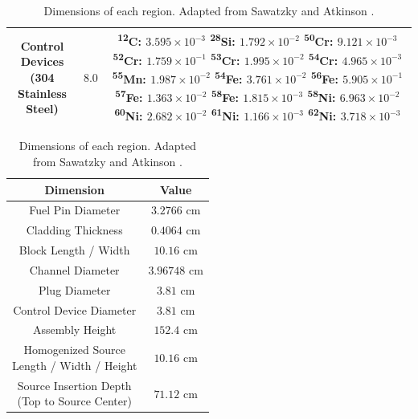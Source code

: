 \begin{table}[H]
{\begin{tabular}{|c|c|c|}
            \hline
            \makecell{Control Devices\\(304 Stainless Steel)} & $8.0$ & \makecell{\textsuperscript{12}C: $3.595\times 10^{-3}$\\\textsuperscript{28}Si: $1.792\times 10^{-2}$\\\textsuperscript{50}Cr: $9.121\times 10^{-3}$\\\textsuperscript{52}Cr: $1.759\times 10^{-1}$\\\textsuperscript{53}Cr: $1.995\times 10^{-2}$\\\textsuperscript{54}Cr: $4.965\times 10^{-3}$\\\textsuperscript{55}Mn: $1.987\times 10^{-2}$\\\textsuperscript{54}Fe: $3.761\times 10^{-2}$\\\textsuperscript{56}Fe: $5.905\times 10^{-1}$\\\textsuperscript{57}Fe: $1.363\times 10^{-2}$\\\textsuperscript{58}Fe: $1.815\times 10^{-3}$\\\textsuperscript{58}Ni: $6.963\times 10^{-2}$\\\textsuperscript{60}Ni: $2.682\times 10^{-2}$\\\textsuperscript{61}Ni: $1.166\times 10^{-3}$\\\textsuperscript{62}Ni: $3.718\times 10^{-3}$}\\
            \hline
        \end{tabular}
        \label{table:subcritical_props}
    }
    \hfill
    \parbox{0.40\linewidth}
    {
        \centering
        \singlespacing
        \caption[Dimensions of each region.]{Dimensions of each region. Adapted from Sawatzky and Atkinson \cite{ks_2024_subcritical}.}
        \begin{tabular}{|cc|}
            \hline
            \textbf{Dimension} & \textbf{Value}\\
            \hline
            Fuel Pin Diameter & $3.2766\text{ cm}$\\
            Cladding Thickness & $0.4064\text{ cm}$\\
            Block Length / Width & $10.16\text{ cm}$\\
            Channel Diameter & $3.96748\text{ cm}$\\
            Plug Diameter & $3.81\text{ cm}$\\
            Control Device Diameter & $3.81\text{ cm}$\\
            Assembly Height & $152.4\text{ cm}$\\
            \makecell{Homogenized Source \\ Length / Width / Height} & $10.16\text{ cm}$\\
            \makecell{Source Insertion Depth \\ (Top to Source Center)} & $71.12\text{ cm}$\\
            \hline
        \end{tabular}
        \label{table:subcritical_dims}
    }
\end{table}
